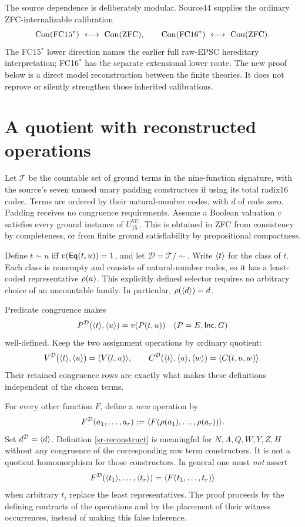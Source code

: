 The source dependence is deliberately modular. Source44 supplies the
ordinary ZFC-internalizable calibration
\[
\srCon(\mathrm{FC15}^*)\ \longleftrightarrow\ \srCon(\mathrm{ZFC}),
\qquad
\srCon(\mathrm{FC16}^*)\ \longleftrightarrow\ \srCon(\mathrm{ZFC}).
\]
The FC15$^*$ lower direction names the earlier full raw-EPSC hereditary
interpretation; FC16$^*$ has the separate extensional lower route. The new
proof below is a direct model reconstruction between the finite theories.
It does not reprove or silently strengthen those inherited calibrations.

\section{A quotient with reconstructed operations}

Let $\mathcal T$ be the countable set of ground terms in the nine-function
signature, with the source's seven unused unary padding constructors if
using its total radix16 codec. Terms are ordered by their natural-number
codes, with $d$ of code zero. Padding receives no congruence requirements.
Assume a Boolean valuation $v$ satisfies every ground instance of
$U_{15}^{VC}$. This is obtained in ZFC from consistency by completeness,
or from finite ground satisfiability by propositional compactness.

Define $t\sim u$ iff $v(\mathsf{Eq}(t,u))=1$, and let
$\mathcal D=\mathcal T/{\sim}$. Write $\langle t\rangle$ for the class of $t$.
Each class is nonempty and consists of natural-number codes, so it has a
least-coded representative $\rho(a)$. This explicitly defined selector
requires no arbitrary choice of an uncountable family. In particular,
$\rho(\langle d\rangle)=d$.

Predicate congruence makes
\[
P^{\mathcal D}(\langle t\rangle,\langle u\rangle)=v(P(t,u))
\quad (P=E,\mathsf{Inc},G)
\]
well-defined. Keep the two assignment operations by ordinary quotient:
\[
V^{\mathcal D}(\langle t\rangle,\langle u\rangle)=\langle V(t,u)\rangle,\qquad
C^{\mathcal D}(\langle t\rangle,\langle u\rangle,\langle w\rangle)=\langle C(t,u,w)\rangle.
\]
Their retained congruence rows are exactly what makes these definitions
independent of the chosen terms.

For every other function $F$, define a \emph{new} operation by
\begin{equation}\label{sr-reconstruct}
F^{\mathcal D}(a_1,\ldots,a_r)
  :=\langle F(\rho(a_1),\ldots,\rho(a_r))\rangle.
\end{equation}
Set $d^{\mathcal D}=\langle d\rangle$. Definition
\eqref{sr-reconstruct} is meaningful for $N,A,Q,W,Y,Z,H$ without any
congruence of the corresponding raw term constructors. It is not a
quotient homomorphism for those constructors. In general one must \emph{not}
assert
\[
F^{\mathcal D}(\langle t_1\rangle,\ldots,\langle t_r\rangle)
   =\langle F(t_1,\ldots,t_r)\rangle
\]
when arbitrary $t_i$ replace the least representatives. The proof proceeds
by the defining contracts of the operations and by the placement of their
witness occurrences, instead of making this false inference.


